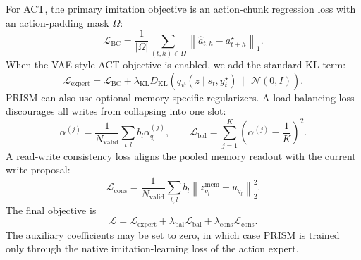 For ACT, the primary imitation objective is an action-chunk regression loss with
an action-padding mask $\Omega$:
\begin{equation}
    \mathcal{L}_{\mathrm{BC}}
    =
    \frac{1}{|\Omega|}
    \sum_{(t,h)\in\Omega}
    \left\|
    \hat a_{t,h} - a_{t+h}^{\star}
    \right\|_1.
    \label{eq:bc_loss}
\end{equation}
When the VAE-style ACT objective is enabled, we add the standard KL term:
\begin{equation}
    \mathcal{L}_{\mathrm{expert}}
    =
    \mathcal{L}_{\mathrm{BC}}
    +
    \lambda_{\mathrm{KL}}
    D_{\mathrm{KL}}
    \left(
    q_{\psi}(z\mid s_t,y_t^\star)\,\|\,\mathcal{N}(0,I)
    \right).
    \label{eq:expert_loss}
\end{equation}
PRISM can also use optional memory-specific regularizers. A load-balancing
loss discourages all writes from collapsing into one slot:
\begin{equation}
    \bar \alpha^{(j)}
    =
    \frac{1}{N_{\mathrm{valid}}}
    \sum_{t,l} b_l \alpha_{q_l}^{(j)},
    \qquad
    \mathcal{L}_{\mathrm{bal}}
    =
    \sum_{j=1}^{K}
    \left(
    \bar \alpha^{(j)} - \frac{1}{K}
    \right)^2.
    \label{eq:balance_loss}
\end{equation}
A read-write consistency loss aligns the pooled memory readout with the current
write proposal:
\begin{equation}
    \mathcal{L}_{\mathrm{cons}}
    =
    \frac{1}{N_{\mathrm{valid}}}
    \sum_{t,l} b_l
    \left\|
    z_{q_l}^{\mathrm{mem}} - u_{q_l}
    \right\|_2^2.
    \label{eq:consistency_loss}
\end{equation}
The final objective is
\begin{equation}
    \mathcal{L}
    =
    \mathcal{L}_{\mathrm{expert}}
    +
    \lambda_{\mathrm{bal}}\mathcal{L}_{\mathrm{bal}}
    +
    \lambda_{\mathrm{cons}}\mathcal{L}_{\mathrm{cons}}.
    \label{eq:total_loss}
\end{equation}
The auxiliary coefficients may be set to zero, in which case PRISM is trained
only through the native imitation-learning loss of the action expert.

